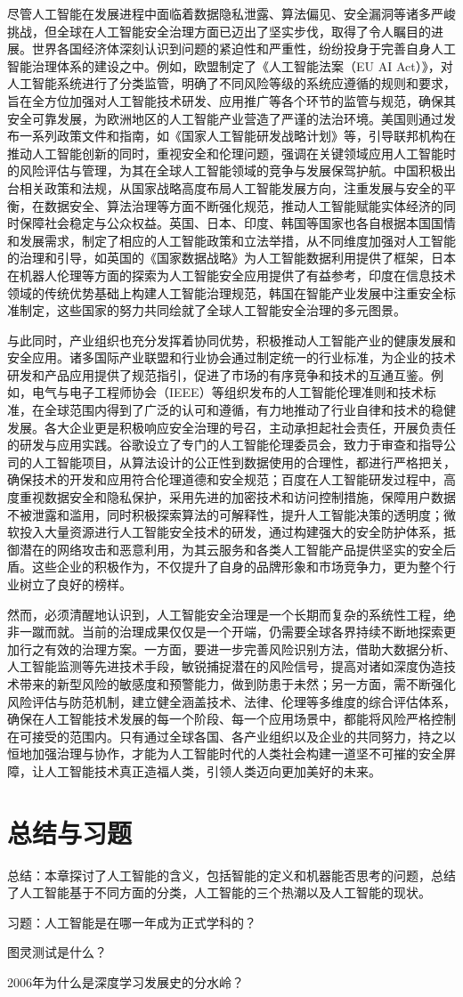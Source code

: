尽管人工智能在发展进程中面临着数据隐私泄露、算法偏见、安全漏洞等诸多严峻挑战，但全球在人工智能安全治理方面已迈出了坚实步伐，取得了令人瞩目的进展。世界各国经济体深刻认识到问题的紧迫性和严重性，纷纷投身于完善自身人工智能治理体系的建设之中。例如，欧盟制定了《人工智能法案（EU AI Act）》，对人工智能系统进行了分类监管，明确了不同风险等级的系统应遵循的规则和要求，旨在全方位加强对人工智能技术研发、应用推广等各个环节的监管与规范，确保其安全可靠发展，为欧洲地区的人工智能产业营造了严谨的法治环境。美国则通过发布一系列政策文件和指南，如《国家人工智能研发战略计划》等，引导联邦机构在推动人工智能创新的同时，重视安全和伦理问题，强调在关键领域应用人工智能时的风险评估与管理，为其在全球人工智能领域的竞争与发展保驾护航。中国积极出台相关政策和法规，从国家战略高度布局人工智能发展方向，注重发展与安全的平衡，在数据安全、算法治理等方面不断强化规范，推动人工智能赋能实体经济的同时保障社会稳定与公众权益。英国、日本、印度、韩国等国家也各自根据本国国情和发展需求，制定了相应的人工智能政策和立法举措，从不同维度加强对人工智能的治理和引导，如英国的《国家数据战略》为人工智能数据利用提供了框架，日本在机器人伦理等方面的探索为人工智能安全应用提供了有益参考，印度在信息技术领域的传统优势基础上构建人工智能治理规范，韩国在智能产业发展中注重安全标准制定，这些国家的努力共同绘就了全球人工智能安全治理的多元图景。


与此同时，产业组织也充分发挥着协同优势，积极推动人工智能产业的健康发展和安全应用。诸多国际产业联盟和行业协会通过制定统一的行业标准，为企业的技术研发和产品应用提供了规范指引，促进了市场的有序竞争和技术的互通互鉴。例如，电气与电子工程师协会（IEEE）等组织发布的人工智能伦理准则和技术标准，在全球范围内得到了广泛的认可和遵循，有力地推动了行业自律和技术的稳健发展。各大企业更是积极响应安全治理的号召，主动承担起社会责任，开展负责任的研发与应用实践。谷歌设立了专门的人工智能伦理委员会，致力于审查和指导公司的人工智能项目，从算法设计的公正性到数据使用的合理性，都进行严格把关，确保技术的开发和应用符合伦理道德和安全规范；百度在人工智能研发过程中，高度重视数据安全和隐私保护，采用先进的加密技术和访问控制措施，保障用户数据不被泄露和滥用，同时积极探索算法的可解释性，提升人工智能决策的透明度；微软投入大量资源进行人工智能安全技术的研发，通过构建强大的安全防护体系，抵御潜在的网络攻击和恶意利用，为其云服务和各类人工智能产品提供坚实的安全后盾。这些企业的积极作为，不仅提升了自身的品牌形象和市场竞争力，更为整个行业树立了良好的榜样。


然而，必须清醒地认识到，人工智能安全治理是一个长期而复杂的系统性工程，绝非一蹴而就。当前的治理成果仅仅是一个开端，仍需要全球各界持续不断地探索更加行之有效的治理方案。一方面，要进一步完善风险识别方法，借助大数据分析、人工智能监测等先进技术手段，敏锐捕捉潜在的风险信号，提高对诸如深度伪造技术带来的新型风险的敏感度和预警能力，做到防患于未然；另一方面，需不断强化风险评估与防范机制，建立健全涵盖技术、法律、伦理等多维度的综合评估体系，确保在人工智能技术发展的每一个阶段、每一个应用场景中，都能将风险严格控制在可接受的范围内。只有通过全球各国、各产业组织以及企业的共同努力，持之以恒地加强治理与协作，才能为人工智能时代的人类社会构建一道坚不可摧的安全屏障，让人工智能技术真正造福人类，引领人类迈向更加美好的未来。

\section{总结与习题}
总结：本章探讨了人工智能的含义，包括智能的定义和机器能否思考的问题，总结了人工智能基于不同方面的分类，人工智能的三个热潮以及人工智能的现状。


习题：人工智能是在哪一年成为正式学科的？


图灵测试是什么？


2006年为什么是深度学习发展史的分水岭？